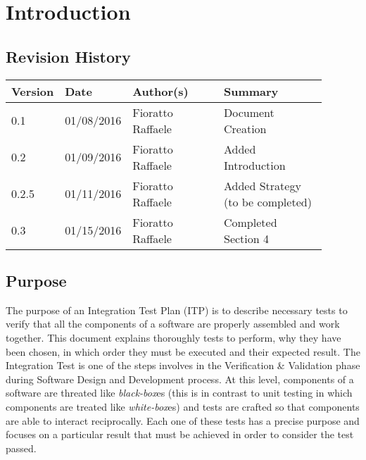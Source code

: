 \newpage
\section{Introduction}
\subsection{Revision History}
\begin{table}[H]
	\centering
	\begin{tabular*}{\linewidth}{|p{0.1\linewidth}|p{0.13\linewidth}|p{0.3099\linewidth}|p{0.3499\linewidth}|}
		\hline
		\textbf{Version} & \textbf{Date}       & \textbf{Author(s)}         & \textbf{Summary}           \\ \hline
		0.1     & 01/08/2016 & Fioratto Raffaele & Document Creation \\ \hline
		0.2		& 01/09/2016 & Fioratto Raffaele & Added Introduction \\ \hline
		0.2.5	& 01/11/2016 & Fioratto Raffaele & Added Strategy (to be completed) \\ \hline 
		0.3		& 01/15/2016 & Fioratto Raffaele & Completed Section 4 \\ \hline
	\end{tabular*}
\end{table}
\break
\subsection{Purpose}
The purpose of an Integration Test Plan (ITP) is to describe necessary tests to verify that all the components of a software are properly assembled and work together. This document explains thoroughly tests to perform, why they have been chosen, in which order they must be executed and their expected result. The Integration Test is one of the steps involves in the Verification \& Validation phase during Software Design and Development process. At this level, components of a software are threated like \textit{black-box}es (this is in contrast to unit testing in which components are treated like \textit{white-box}es) and tests are crafted so that components are able to interact reciprocally. Each one of these tests has a precise purpose and focuses on a particular result that must be achieved in order to consider the test passed.
